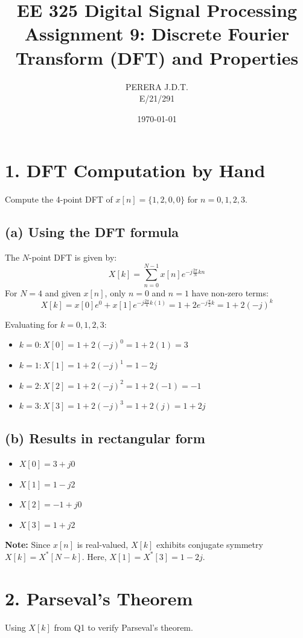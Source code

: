 \documentclass[11pt, a4paper]{article}
\title{EE 325 Digital Signal Processing \\ Assignment 9: Discrete Fourier Transform (DFT) and Properties}
\author{PERERA J.D.T. \\ E/21/291}
\date{\today}
\begin{document}
\maketitle

\section{1. DFT Computation by Hand}
Compute the 4-point DFT of $x[n] = \{1, 2, 0, 0\}$ for $n = 0, 1, 2, 3$.

\subsection{(a) Using the DFT formula}
The $N$-point DFT is given by:
$$ X[k] = \sum_{n=0}^{N-1} x[n] e^{-j \frac{2\pi}{N} kn } $$
For $N = 4$ and given $x[n]$, only $n=0$ and $n=1$ have non-zero terms:
$$ X[k] = x[0] e^{0} + x[1] e^{-j \frac{2\pi}{4} k(1)} = 1 + 2e^{-j \frac{\pi}{2} k} = 1 + 2(-j)^k $$

Evaluating for $k = 0, 1, 2, 3$:
\begin{itemize}
    \item $k = 0: X[0] = 1 + 2(-j)^0 = 1 + 2(1) = 3$
    \item $k = 1: X[1] = 1 + 2(-j)^1 = 1 - 2j$
    \item $k = 2: X[2] = 1 + 2(-j)^2 = 1 + 2(-1) = -1$
    \item $k = 3: X[3] = 1 + 2(-j)^3 = 1 + 2(j) = 1 + 2j$
\end{itemize}

\subsection{(b) Results in rectangular form}
\begin{itemize}
    \item $X[0] = 3 + j0$
    \item $X[1] = 1 - j2$
    \item $X[2] = -1 + j0$
    \item $X[3] = 1 + j2$
\end{itemize}
\textbf{Note:} Since $x[n]$ is real-valued, $X[k]$ exhibits conjugate symmetry $X[k] = X^*[N-k]$. Here, $X[1] = X^*[3] = 1 - 2j$.

\section{2. Parseval's Theorem}
Using $X[k]$ from Q1 to verify Parseval's theorem.
\end{document}
